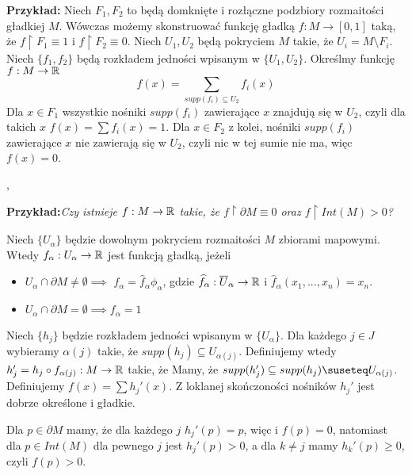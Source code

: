 \textbf{Przykład:} Niech $F_1,F_2$ to będą domknięte i rozłączne podzbiory rozmaitości gładkiej $M$. Wówczas możemy skonstruować funkcję gładką $f:M\to[0,1]$ taką, że $f\restriction F_1\equiv 1$ i $f\restriction F_2\equiv 0$. Niech $U_1,U_2$ będą pokryciem $M$ takie, że $U_i=M\setminus F_i$. Niech $\{f_1,f_2\}$ będą rozkładem jedności wpisanym w $\{U_1,U_2\}$. Określmy funkcję $f:M\to\mathbb{R}$
$$f(x)=\sum\limits_{supp(f_i)\subseteq U_2}f_i(x)$$
Dla $x\in F_1$ wszystkie nośniki $supp(f_i)$ zawierające $x$ znajdują się w $U_2$, czyli dla takich $x$ $f(x)=\sum f_i(x)=1$. Dla $x\in F_2$ z kolei, nośniki $supp(f_i)$ zawierające $x$ nie zawierają się w $U_2$, czyli nic w tej sumie nie ma, więc $f(x)=0$.
\medskip

\sep
\medskip

\textbf{Przykład:}\emph{Czy istnieje $f:M\to\mathbb{R}$ takie, że $f\restriction\partial M\equiv 0$ oraz $f\restriction Int(M)>0$?}

Niech $\{U_\alpha\}$ będzie dowolnym pokryciem rozmaitości $M$ zbiorami mapowymi. Wtedy $f_\alpha:U_\alpha\to\mathbb{R}$ jest funkcją gładką, jeżeli
\begin{itemize}
    \item $U_\alpha\cap\partial M\neq\emptyset\implies$ $f_\alpha=\hat{f}_\alpha\phi_\alpha$, gdzie $\widehat{f}_\alpha:\overline U_\alpha\to \mathbb{R}$ i $\hat{f}_\alpha(x_1,...,x_n)=x_n$.
    \item $U_\alpha\cap\partial M=\emptyset\implies f_\alpha=1$
\end{itemize}
Niech $\{h_j\}$ będzie rozkładem jedności wpisanym w $\{U_\alpha\}$. Dla każdego $j\in J$ wybieramy $\alpha(j)$ takie, że $supp(h_j)\subseteq U_{\alpha(j)}$. Definiujemy wtedy $h_j'=h_j\circ f_{\alpha(j)}:M\to\mathbb{R}$ takie, że
Mamy, że $supp(h_j')\subseteq supp(h_j)\suseteq U_{\alpha(j)}$.
Definiujemy $f(x)=\sum h_j'(x)$.
Z loklanej skończoności nośników $h_j'$ jest dobrze określone i gładkie. 

Dla $p\in\partial M$ mamy, że dla każdego $j$ $h_j'(p)=p$, więc i $f(p)=0$, natomiast dla $p\in Int(M)$ dla pewnego $j$ jest $h_j'(p)>0$, a dla $k\neq j$ mamy $h_k'(p)\geq0$, czyli $f(p)>0$.






